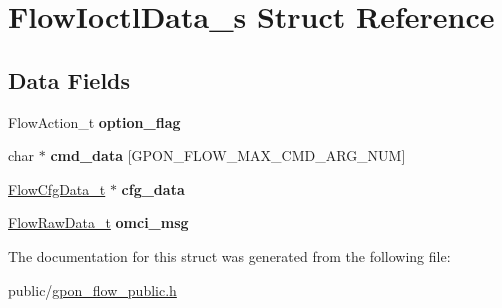 \hypertarget{structFlowIoctlData__s}{}\section{Flow\+Ioctl\+Data\+\_\+s Struct Reference}
\label{structFlowIoctlData__s}
\subsection*{Data Fields}
\begin{DoxyCompactItemize}
\item 
\mbox{\label{structFlowIoctlData__s_a7e92fd629a4c10c3fdb2e35803b38bc2}} 
Flow\+Action\+\_\+t {\bfseries option\+\_\+flag}
\item 
\mbox{\label{structFlowIoctlData__s_a9fd859fad316b802dc1eeecdae8fbba6}} 
char $\ast$ {\bfseries cmd\+\_\+data} \mbox{[}G\+P\+O\+N\+\_\+\+F\+L\+O\+W\+\_\+\+M\+A\+X\+\_\+\+C\+M\+D\+\_\+\+A\+R\+G\+\_\+\+N\+UM\mbox{]}
\item 
\mbox{\label{structFlowIoctlData__s_ad5e2972b1110d53582607609a40e3c78}} 
\hyperlink{structFlowCfgData__s}{Flow\+Cfg\+Data\+\_\+t} $\ast$ {\bfseries cfg\+\_\+data}
\item 
\mbox{\label{structFlowIoctlData__s_a83f179fe9ed5696b1db0658f740a148d}} 
\hyperlink{structFlowRawData__s}{Flow\+Raw\+Data\+\_\+t} {\bfseries omci\+\_\+msg}
\end{DoxyCompactItemize}


The documentation for this struct was generated from the following file\+:\begin{DoxyCompactItemize}
\item 
public/\hyperlink{gpon__flow__public_8h}{gpon\+\_\+flow\+\_\+public.\+h}\end{DoxyCompactItemize}
